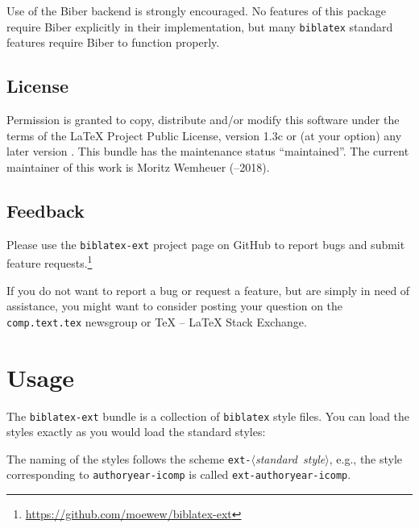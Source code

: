 \documentclass[DIV=9]{scrartcl}
\def\tex{TeX}%
\def\latex{LaTeX}%
\def\lppl{LaTeX Project Public License}%
\def\sty{\texttt}
\newcommand*{\gitbaseurl}{https://github.com/moewew/biblatex-ext}
\newcommand*{\biber}{Biber}
\begin{document}
Use of the \biber{} backend is strongly encouraged.
No features of this package require \biber{} explicitly in their implementation,
but many \sty{biblatex} standard features require \biber{} to function properly.

\subsection{License}
Permission is granted to copy, distribute and\slash or modify this software
under the terms of the \lppl, version 1.3c%
or (at your option) any later version%
.
This bundle has the maintenance status \enquote{maintained}.
The current maintainer of this work is Moritz Wemheuer
(--2018).


\subsection{Feedback}\label{subsec:int:feb}

Please use the \sty{biblatex-ext} project page on GitHub to report bugs and
submit feature requests.\footnote{\url{\gitbaseurl}}

If you do not want to report a bug or request a feature, but are simply in need
of assistance, you might want to consider posting your question on the
\texttt{comp.text.tex} newsgroup or \tex{} -- \latex{} Stack Exchange.%

\section{Usage}

The \sty{biblatex-ext} bundle is a collection of \sty{biblatex} style files.
You can load the styles exactly as you would load the standard styles:
\begin{biblatexcode}
\usepackage[style=(*@$\langle$\normalfont\emph{style}$\rangle$@*)]{biblatex}
\end{biblatexcode}
The naming of the styles follows the scheme
\mbox{\texttt{ext-}$\langle$\emph{standard style}$\rangle$}, e.g.,
the style corresponding to \texttt{authoryear-icomp} is called
\texttt{ext-authoryear-icomp}.
\end{document}
